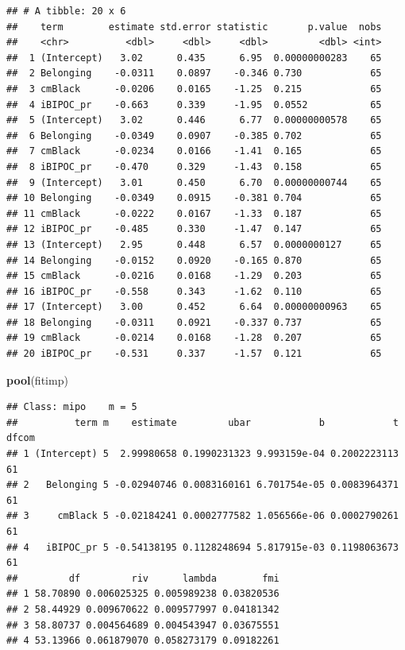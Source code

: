 \documentclass[
  11pt,
]{book}
\newenvironment{Shaded}{\begin{snugshade}}{\end{snugshade}}
\newcommand{\FunctionTok}[1]{\textcolor[rgb]{0.27,0.27,0.27}{\textbf{#1}}}
\newcommand{\NormalTok}[1]{#1}
\begin{document}
\begin{verbatim}
## # A tibble: 20 x 6
##    term        estimate std.error statistic       p.value  nobs
##    <chr>          <dbl>     <dbl>     <dbl>         <dbl> <int>
##  1 (Intercept)   3.02      0.435      6.95  0.00000000283    65
##  2 Belonging    -0.0311    0.0897    -0.346 0.730            65
##  3 cmBlack      -0.0206    0.0165    -1.25  0.215            65
##  4 iBIPOC_pr    -0.663     0.339     -1.95  0.0552           65
##  5 (Intercept)   3.02      0.446      6.77  0.00000000578    65
##  6 Belonging    -0.0349    0.0907    -0.385 0.702            65
##  7 cmBlack      -0.0234    0.0166    -1.41  0.165            65
##  8 iBIPOC_pr    -0.470     0.329     -1.43  0.158            65
##  9 (Intercept)   3.01      0.450      6.70  0.00000000744    65
## 10 Belonging    -0.0349    0.0915    -0.381 0.704            65
## 11 cmBlack      -0.0222    0.0167    -1.33  0.187            65
## 12 iBIPOC_pr    -0.485     0.330     -1.47  0.147            65
## 13 (Intercept)   2.95      0.448      6.57  0.0000000127     65
## 14 Belonging    -0.0152    0.0920    -0.165 0.870            65
## 15 cmBlack      -0.0216    0.0168    -1.29  0.203            65
## 16 iBIPOC_pr    -0.558     0.343     -1.62  0.110            65
## 17 (Intercept)   3.00      0.452      6.64  0.00000000963    65
## 18 Belonging    -0.0311    0.0921    -0.337 0.737            65
## 19 cmBlack      -0.0214    0.0168    -1.28  0.207            65
## 20 iBIPOC_pr    -0.531     0.337     -1.57  0.121            65
\end{verbatim}

\begin{Shaded}
\begin{Highlighting}[]
\FunctionTok{pool}\NormalTok{(fitimp)}
\end{Highlighting}
\end{Shaded}

\begin{verbatim}
## Class: mipo    m = 5 
##          term m    estimate         ubar            b            t dfcom
## 1 (Intercept) 5  2.99980658 0.1990231323 9.993159e-04 0.2002223113    61
## 2   Belonging 5 -0.02940746 0.0083160161 6.701754e-05 0.0083964371    61
## 3     cmBlack 5 -0.02184241 0.0002777582 1.056566e-06 0.0002790261    61
## 4   iBIPOC_pr 5 -0.54138195 0.1128248694 5.817915e-03 0.1198063673    61
##         df         riv      lambda        fmi
## 1 58.70890 0.006025325 0.005989238 0.03820536
## 2 58.44929 0.009670622 0.009577997 0.04181342
## 3 58.80737 0.004564689 0.004543947 0.03675551
## 4 53.13966 0.061879070 0.058273179 0.09182261
\end{verbatim}
\end{document}
